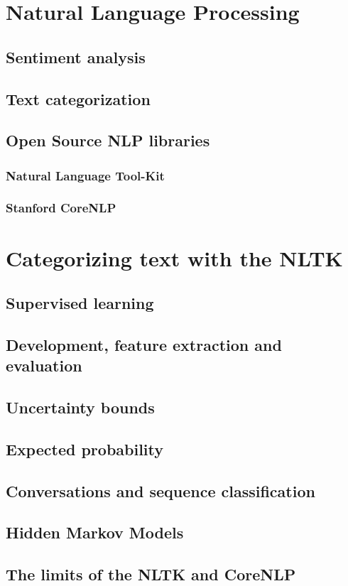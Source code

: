 \documentclass[12pt, twoside, a4paper, draft]{report}
\begin{document}
\section{Natural Language Processing}
\subsection{Sentiment analysis}
\subsection{Text categorization}
\subsection{Open Source NLP libraries}
\subsubsection{Natural Language Tool-Kit}
\subsubsection{Stanford CoreNLP}
\section{Categorizing text with the NLTK}
\subsection{Supervised learning}
\subsection{Development, feature extraction and evaluation}
\subsection{Uncertainty bounds}
\subsection{Expected probability}
\subsection{Conversations and sequence classification}
\subsection{Hidden Markov Models}
\subsection{The limits of the NLTK and CoreNLP}
\end{document}
